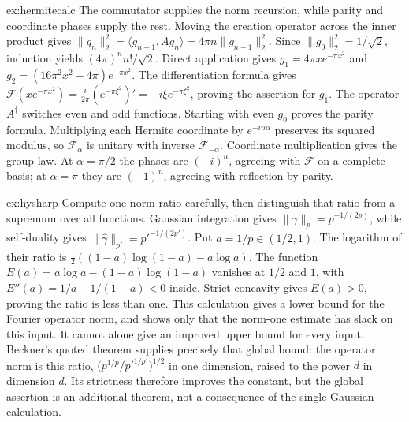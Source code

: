 \begin{solution}{ex:hermitecalc}
\idea The commutator supplies the norm recursion, while parity and coordinate phases supply the rest.
\writeup Moving the creation operator across the inner product gives
$\|g_n\|_2^2=\langle g_{n-1},Ag_n\rangle=4\pi n\|g_{n-1}\|_2^2$.
Since $\|g_0\|_2^2=1/\sqrt2$, induction yields $(4\pi)^nn!/\sqrt2$. Direct application gives
$g_1=4\pi xe^{-\pi x^2}$ and $g_2=(16\pi^2x^2-4\pi)e^{-\pi x^2}$.
The differentiation formula gives $\mathcal F(xe^{-\pi x^2})=\tfrac i{2\pi}(e^{-\pi\xi^2})'=-i\xi e^{-\pi\xi^2}$, proving the assertion for $g_1$.
The operator $A^\dagger$ switches even and odd functions. Starting with even $g_0$ proves the parity formula. Multiplying each Hermite coordinate by $e^{-in\alpha}$ preserves its squared modulus, so $\mathcal F_\alpha$ is unitary with inverse $\mathcal F_{-\alpha}$. Coordinate multiplication gives the group law. At $\alpha=\pi/2$ the phases are $(-i)^n$, agreeing with $\mathcal F$ on a complete basis; at $\alpha=\pi$ they are $(-1)^n$, agreeing with reflection by parity.
\end{solution}

\begin{solution}{ex:hysharp}
\idea Compute one norm ratio carefully, then distinguish that ratio from a supremum over all functions.
\writeup Gaussian integration gives $\|\gamma\|_p=p^{-1/(2p)}$, while self-duality gives $\|\hat\gamma\|_{p'}=p'^{-1/(2p')}$. Put $a=1/p\in(1/2,1)$. The logarithm of their ratio is
$\tfrac12((1-a)\log(1-a)-a\log a)$.
The function $E(a)=a\log a-(1-a)\log(1-a)$ vanishes at $1/2$ and $1$, with $E''(a)=1/a-1/(1-a)<0$ inside. Strict concavity gives $E(a)>0$, proving the ratio is less than one.
This calculation gives a lower bound for the Fourier operator norm, and shows only that the norm-one estimate has slack on this input. It cannot alone give an improved upper bound for every input. Beckner's quoted theorem supplies precisely that global bound: the operator norm is this ratio, $\bigl(p^{1/p}/p'^{1/p'}\bigr)^{1/2}$ in one dimension, raised to the power $d$ in dimension $d$. Its strictness therefore improves the constant, but the global assertion is an additional theorem, not a consequence of the single Gaussian calculation.
\end{solution}

